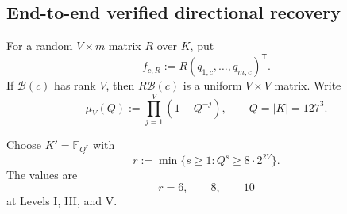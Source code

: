 \documentclass[11pt,a4paper]{article}
\theoremstyle{definition}
\theoremstyle{remark}
\newcommand{\F}{\mathbb F}
\begin{document}
\subsection{End-to-end verified directional recovery}

For a random $V\times m$ matrix $R$ over $K$, put
\[
 f_{c,R}:=R(q_{1,c},\ldots,q_{m,c})^{\mathsf T}.
\]
If $\mathcal B(c)$ has rank $V$, then $R\mathcal B(c)$ is a uniform $V\times V$ matrix.  Write
\begin{equation}\label{eq:mu-square}
 \mu_V(Q):=\prod_{j=1}^V(1-Q^{-j}),
 \qquad Q=|K|=127^3.
\end{equation}

Choose $K'=\F_{Q^r}$ with
\begin{equation}\label{eq:r-choice}
 r:=\min\{s\ge1:Q^s\ge8\cdot2^{2V}\}.
\end{equation}
The values are
\begin{equation}\label{eq:r-values}
 r=6,\qquad8,\qquad10
\end{equation}
at Levels I, III, and V.
\end{document}
